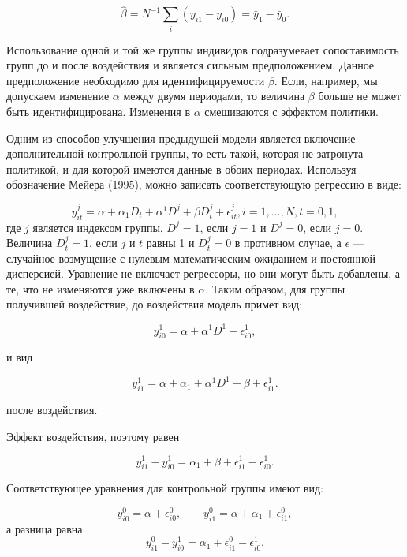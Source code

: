 \[
\hat{\beta}=N^{-1}\sum_{i}(y_{i1}-y_{i0})=\bar{y}_{1}-\bar{y}_{0}.
\]

Использование одной и той же группы индивидов подразумевает сопоставимость групп до и после воздействия и  является сильным предположением. Данное предположение необходимо для идентифицируемости $\beta$. Если, например, мы допускаем изменение $\alpha$ между  двумя периодами, то величина $\beta$ больше не может быть идентифицирована. Изменения в $\alpha$ смешиваются с эффектом политики.

Одним из способов улучшения предыдущей модели является включение дополнительной контрольной группы, то есть такой, которая не затронута политикой, и для которой имеются данные в обоих периодах. Используя обозначение Мейера (1995), можно записать соответствующую регрессию в виде:


\[
y^{j}_{it}=\alpha+\alpha_{1}D_{t}+\alpha^{1}D^{j}+\beta D^{j}_{t} +\epsilon^{j}_{it}, i=1, \dots, N, t=0,1,
\]
где $j$ является индексом группы, $D^{j}=1$, если $j=1$ и $D^{j}=0$, если $j=0$.  Величина $D^{j}_{t}=1$, если $j$ и $t$ равны 1 и $D^{j}_{t}=0$ в противном случае, а $\epsilon$ --- случайное возмущение с нулевым математическим ожиданием и постоянной дисперсией. Уравнение не включает регрессоры, но они могут быть добавлены, а те, что не изменяются уже включены в  $\alpha$. Таким образом, для группы получившей воздействие, до воздействия модель примет вид:

\[
y^{1}_{i0}=\alpha+\alpha^{1}D^{1}+\epsilon^{1}_{i0},
\]

и вид 

\[
y^{1}_{i1}=\alpha+\alpha_{1}+\alpha^{1}D^{1}+\beta +\epsilon^{1}_{i1}.
\]

после воздействия.

Эффект воздействия, поэтому равен

\begin{equation}
y^{1}_{i1}-y^{1}_{i0}=\alpha_{1}+\beta+\epsilon^{1}_{i1}-\epsilon^{1}_{i0}.
\end{equation}

Соответствующее уравнения для контрольной группы имеют вид:

\[
y^{0}_{i0}=\alpha+\epsilon^{0}_{i0}, \qquad
y^{0}_{i1}=\alpha+\alpha_{1}+\epsilon^{0}_{i1},
\]
а разница равна
\begin{equation} %
y^{0}_{i1}-y^{1}_{i0}=\alpha_{1}+\epsilon^{0}_{i1}-\epsilon^{1}_{i0}.
\end{equation}

